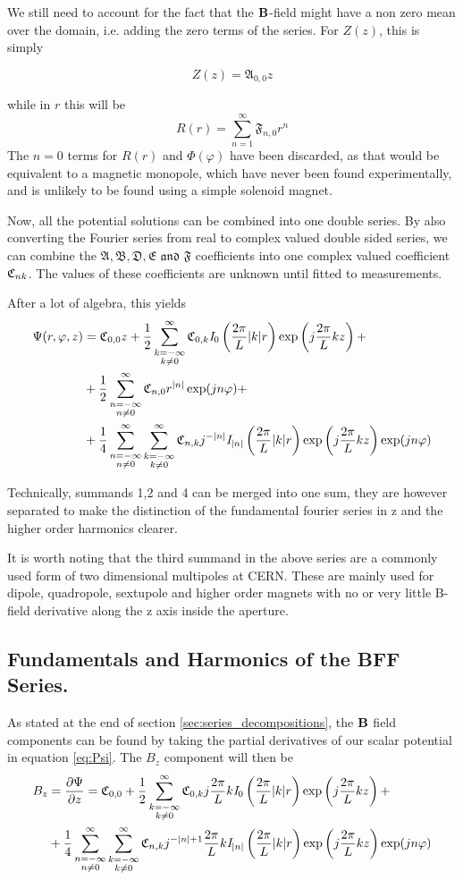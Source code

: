 We still need to account for the fact that the $\vb{B}$-field might have
a non zero mean over the domain, i.e. adding the zero terms of the series.
For $Z(z)$, this is simply

\begin{equation}
    Z(z) = \mathfrak{A}_{0,0}z
\end{equation}

while in $r$ this will be
\begin{equation}
    R(r) = \sum\limits_{n=1}^{\infty} \mathfrak{F}_{n,0}r^n
\end{equation}
\cite[pp.12-14]{moon_field_1988}
The $n=0$ terms for $R(r)$ and $\varPhi(\varphi)$ have been discarded,
as that would be equivalent to a magnetic monopole, which have never
been found experimentally, and is unlikely to be found using a simple
solenoid magnet.\cite{Acharya2022}

Now, all the potential solutions can be combined into one double
series. By also converting the Fourier series from real to complex
valued double sided series, we can combine the 
$\mathfrak{A, B, D, E \text{ and } F}$
coefficients into one complex valued coefficient $\Cnk$. The values
of these coefficients are unknown until fitted to measurements.

After a lot of algebra, this yields
\begin{equation} \label{eq:Psi}
    \begin{split}
        \Psi(r,\varphi,z) &=\Cnk[0,0]z + \Bffok +\\
        &+ \Bffno +\\ &+ \Bffnk
    \end{split}
\end{equation}

Technically, summands 1,2 and 4 can be merged into one sum,
they are however separated to make the distinction of the
fundamental fourier series in z and the higher order
harmonics clearer.

It is worth noting that the third summand in the above series
are a commonly used form of two dimensional multipoles at CERN.
These are mainly used for dipole, quadropole, sextupole and 
higher order magnets with no or very little B-field 
derivative along the z axis inside the aperture.
\cite[Ch.6.1]{russenschuck_field_2011}

\subsection{Fundamentals and Harmonics of the BFF Series.}
As stated at the end of section \ref{sec:series_decompositions},
the $\vb{B}$ field components can be found by taking
the partial derivatives of our scalar potential in
equation \ref{eq:Psi}.
The $B_z$ component will then be
\begin{equation}
    \begin{split}
        B_z &= \frac{\partial \Psi}{\partial z} =
        \Cnk[0,0] + \Bffzok +\\
        &+ \Bffznk
    \end{split}
\end{equation}

